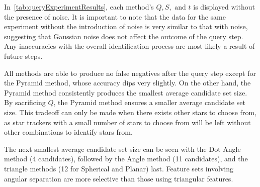 \begin{table}
\end{table}

In~\autoref{tab:queryExperimentResults}, each method's $Q, S, \text{ and } t$ is displayed without the presence of
noise.
It is important to note that the data for the same experiment without the introduction of noise is very similar to that
with noise, suggesting that Gaussian noise does not affect the outcome of the query step.
Any inaccuracies with the overall identification process are most likely a result of future steps.

All methods are able to produce no false negatives after the query step except for the Pyramid method, whose accuracy
dips very slightly.
On the other hand, the Pyramid method consistently produces the smallest average candidate set size.
By sacrificing $Q$, the Pyramid method ensures a smaller average candidate set size.
This tradeoff can only be made when there exists other stars to choose from, as star trackers with a small number of
stars to choose from will be left without other combinations to identify stars from.

The next smallest average candidate set size can be seen with the Dot Angle method (4 candidates), followed by the
Angle method (11 candidates), and the triangle methods (12 for Spherical and Planar) last.
Feature sets involving angular separation are more selective than those using triangular features.

